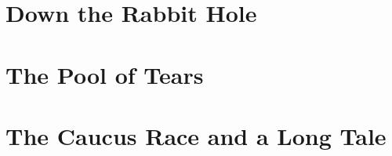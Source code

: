 \documentclass{memoir}
\begin{document}
\tableofcontents*

\chapter{Down the Rabbit Hole}
\chapter{The Pool of Tears}
\chapter{The Caucus Race and a Long Tale}
\setcounter{page}{14}%
\end{document}
